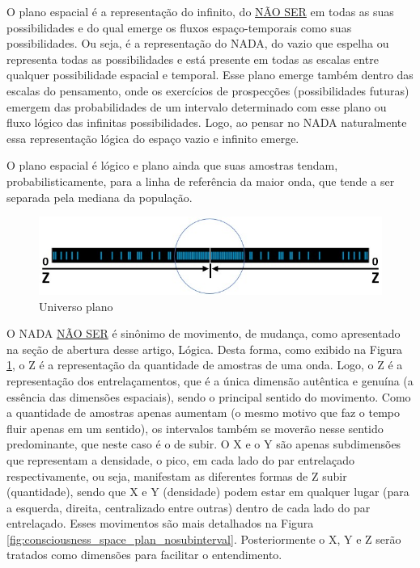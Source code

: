 O plano espacial é a representação do infinito, do \underline{NÃO SER} em todas as suas possibilidades e do qual emerge os fluxos espaço-temporais como suas possibilidades. Ou seja, é a representação do NADA, do vazio que espelha ou representa todas as possibilidades e está presente em todas as escalas entre qualquer possibilidade espacial e temporal. Esse plano emerge também dentro das escalas do pensamento, onde os exercícios de prospecções (possibilidades futuras) emergem das probabilidades de um intervalo determinado com esse plano ou fluxo lógico das infinitas possibilidades. Logo, ao pensar no NADA naturalmente essa representação lógica do espaço vazio e infinito emerge.

O plano espacial é lógico e plano ainda que suas amostras tendam, probabilisticamente, para a linha de referência da maior onda, que tende a ser separada pela mediana da população.
	\begin{figure}[H]
	\caption{Universo plano}
	\label{fig:consciousness_flat_universe}
	\centering
	\includegraphics[scale=.6]{sections/images/consciousness_flat_universe.jpg}
	\end{figure}

O NADA \underline{NÃO SER} é sinônimo de movimento, de mudança, como apresentado na seção de abertura desse artigo, Lógica. Desta forma, como exibido na Figura \ref{fig:consciousness_flat_universe}, o Z é a representação da quantidade de amostras de uma onda. Logo, o Z é a representação dos entrelaçamentos, que é a única dimensão autêntica e genuína (a essência das dimensões espaciais), sendo o principal sentido do movimento. Como a quantidade de amostras apenas aumentam (o mesmo motivo que faz o tempo fluir apenas em um sentido), os intervalos também se moverão nesse sentido predominante, que neste caso é o de subir. O X e o Y são apenas subdimensões que representam a densidade, o pico, em cada lado do par entrelaçado respectivamente, ou seja, manifestam as diferentes formas de Z subir (quantidade), sendo que X e Y (densidade) podem estar em qualquer lugar (para a esquerda, direita, centralizado entre outras) dentro de cada lado do par entrelaçado. Esses movimentos são mais detalhados na Figura \ref{fig:consciousness_space_plan_nosubinterval}. Posteriormente o X, Y e Z serão tratados como dimensões para facilitar o entendimento.


